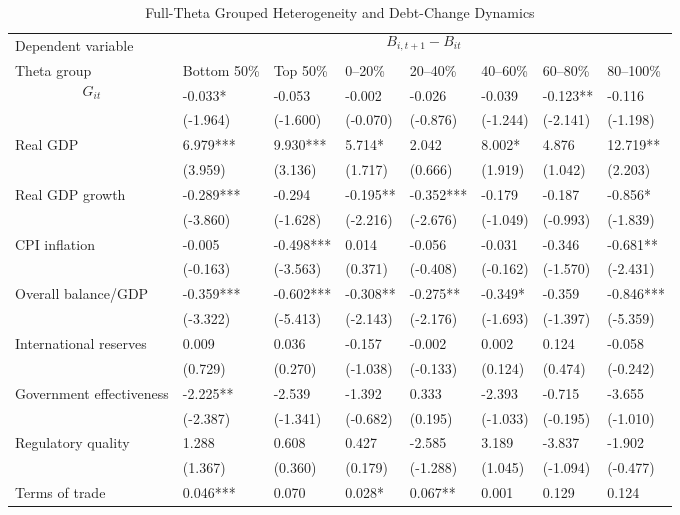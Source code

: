 \begin{table}[H]\centering
\begin{threeparttable}
\caption{Full-Theta Grouped Heterogeneity and Debt-Change Dynamics}
\label{tab:theta_group_heterogeneity_debt}
\scriptsize
\begin{tabularx}{\textwidth}{lYYYYYYY}
\toprule
Dependent variable &  \\
\cmidrule(lr){2-8}
Theta group & Bottom 50\% & Top 50\% & 0--20\% & 20--40\% & 40--60\% & 60--80\% & 80--100\% \\
\midrule
$$G_{it}$$ & -0.033* & -0.053 & -0.002 & -0.026 & -0.039 & -0.123** & -0.116 \\
  & (-1.964) & (-1.600) & (-0.070) & (-0.876) & (-1.244) & (-2.141) & (-1.198) \\
Real GDP & 6.979*** & 9.930*** & 5.714* & 2.042 & 8.002* & 4.876 & 12.719** \\
  & (3.959) & (3.136) & (1.717) & (0.666) & (1.919) & (1.042) & (2.203) \\
Real GDP growth & -0.289*** & -0.294 & -0.195** & -0.352*** & -0.179 & -0.187 & -0.856* \\
  & (-3.860) & (-1.628) & (-2.216) & (-2.676) & (-1.049) & (-0.993) & (-1.839) \\
CPI inflation & -0.005 & -0.498*** & 0.014 & -0.056 & -0.031 & -0.346 & -0.681** \\
  & (-0.163) & (-3.563) & (0.371) & (-0.408) & (-0.162) & (-1.570) & (-2.431) \\
Overall balance/GDP & -0.359*** & -0.602*** & -0.308** & -0.275** & -0.349* & -0.359 & -0.846*** \\
  & (-3.322) & (-5.413) & (-2.143) & (-2.176) & (-1.693) & (-1.397) & (-5.359) \\
International reserves & 0.009 & 0.036 & -0.157 & -0.002 & 0.002 & 0.124 & -0.058 \\
  & (0.729) & (0.270) & (-1.038) & (-0.133) & (0.124) & (0.474) & (-0.242) \\
Government effectiveness & -2.225** & -2.539 & -1.392 & 0.333 & -2.393 & -0.715 & -3.655 \\
  & (-2.387) & (-1.341) & (-0.682) & (0.195) & (-1.033) & (-0.195) & (-1.010) \\
Regulatory quality & 1.288 & 0.608 & 0.427 & -2.585 & 3.189 & -3.837 & -1.902 \\
  & (1.367) & (0.360) & (0.179) & (-1.288) & (1.045) & (-1.094) & (-0.477) \\
Terms of trade & 0.046*** & 0.070 & 0.028* & 0.067** & 0.001 & 0.129 & 0.124 \\

\end{tabularx}
\end{threeparttable}
\end{table}
